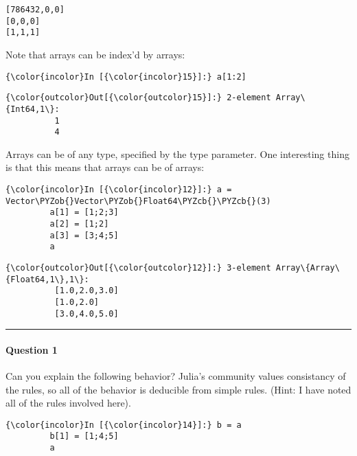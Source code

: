 \documentclass[11pt]{article}
\def\PYZob{\char`\{}
\def\PYZcb{\char`\}}
\begin{document}
    \begin{Verbatim}[commandchars=\\\{\}]
[786432,0,0]
[0,0,0]
[1,1,1]

    \end{Verbatim}

    Note that arrays can be index'd by arrays:

    \begin{Verbatim}[commandchars=\\\{\}]
{\color{incolor}In [{\color{incolor}15}]:} a[1:2]
\end{Verbatim}

            \begin{Verbatim}[commandchars=\\\{\}]
{\color{outcolor}Out[{\color{outcolor}15}]:} 2-element Array\{Int64,1\}:
          1
          4
\end{Verbatim}
        
    Arrays can be of any type, specified by the type parameter. One
interesting thing is that this means that arrays can be of arrays:

    \begin{Verbatim}[commandchars=\\\{\}]
{\color{incolor}In [{\color{incolor}12}]:} a = Vector\PYZob{}Vector\PYZob{}Float64\PYZcb{}\PYZcb{}(3)
         a[1] = [1;2;3]
         a[2] = [1;2]
         a[3] = [3;4;5]
         a
\end{Verbatim}

            \begin{Verbatim}[commandchars=\\\{\}]
{\color{outcolor}Out[{\color{outcolor}12}]:} 3-element Array\{Array\{Float64,1\},1\}:
          [1.0,2.0,3.0]
          [1.0,2.0]    
          [3.0,4.0,5.0]
\end{Verbatim}
        
    \begin{center}\rule{3in}{0.4pt}\end{center}

\paragraph{Question 1}\label{question-1}

Can you explain the following behavior? Julia's community values
consistancy of the rules, so all of the behavior is deducible from
simple rules. (Hint: I have noted all of the rules involved here).

    \begin{Verbatim}[commandchars=\\\{\}]
{\color{incolor}In [{\color{incolor}14}]:} b = a
         b[1] = [1;4;5]
         a
\end{Verbatim}
\end{document}
